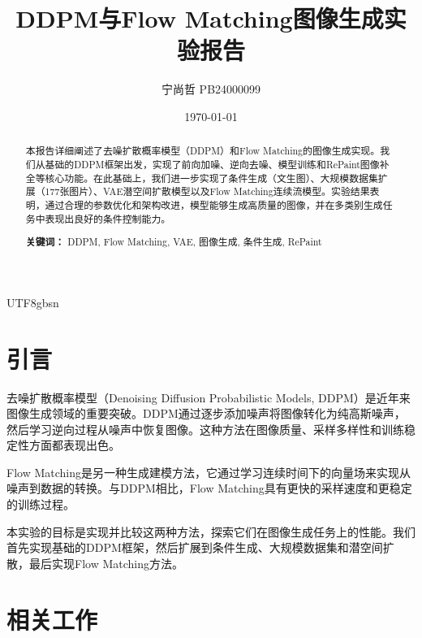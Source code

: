 \documentclass[11pt,a4paper]{article}
\title{DDPM与Flow Matching图像生成实验报告}
\author{宁尚哲 \quad PB24000099}
\date{\today}
\begin{document}
\begin{CJK*}{UTF8}{gbsn}

\maketitle

\begin{abstract}
本报告详细阐述了去噪扩散概率模型（DDPM）和Flow Matching的图像生成实现。我们从基础的DDPM框架出发，实现了前向加噪、逆向去噪、模型训练和RePaint图像补全等核心功能。在此基础上，我们进一步实现了条件生成（文生图）、大规模数据集扩展（177张图片）、VAE潜空间扩散模型以及Flow Matching连续流模型。实验结果表明，通过合理的参数优化和架构改进，模型能够生成高质量的图像，并在多类别生成任务中表现出良好的条件控制能力。

\textbf{关键词：} DDPM, Flow Matching, VAE, 图像生成, 条件生成, RePaint
\end{abstract}

\section{引言}

去噪扩散概率模型（Denoising Diffusion Probabilistic Models, DDPM）\cite{ho2020denoising}是近年来图像生成领域的重要突破。DDPM通过逐步添加噪声将图像转化为纯高斯噪声，然后学习逆向过程从噪声中恢复图像。这种方法在图像质量、采样多样性和训练稳定性方面都表现出色。

Flow Matching\cite{lipman2022flow}是另一种生成建模方法，它通过学习连续时间下的向量场来实现从噪声到数据的转换。与DDPM相比，Flow Matching具有更快的采样速度和更稳定的训练过程。

本实验的目标是实现并比较这两种方法，探索它们在图像生成任务上的性能。我们首先实现基础的DDPM框架，然后扩展到条件生成、大规模数据集和潜空间扩散，最后实现Flow Matching方法。

\section{相关工作}


\end{CJK*}
\end{document}
